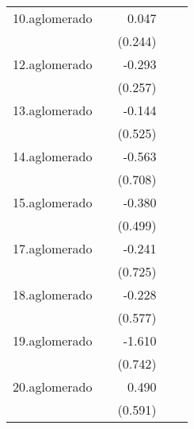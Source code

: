 {\begin{longtable}{l*{4}{D{.}{.}{-1}}}
\addlinespace
10.aglomerado&                     &       0.047         &                     &                     \\
            &                     &     (0.244)         &                     &                     \\
\addlinespace
12.aglomerado&                     &      -0.293         &                     &                     \\
            &                     &     (0.257)         &                     &                     \\
\addlinespace
13.aglomerado&                     &      -0.144         &                     &                     \\
            &                     &     (0.525)         &                     &                     \\
\addlinespace
14.aglomerado&                     &      -0.563         &                     &                     \\
            &                     &     (0.708)         &                     &                     \\
\addlinespace
15.aglomerado&                     &      -0.380         &                     &                     \\
            &                     &     (0.499)         &                     &                     \\
\addlinespace
17.aglomerado&                     &      -0.241         &                     &                     \\
            &                     &     (0.725)         &                     &                     \\
\addlinespace
18.aglomerado&                     &      -0.228         &                     &                     \\
            &                     &     (0.577)         &                     &                     \\
\addlinespace
19.aglomerado&                     &      -1.610\sym{*}  &                     &                     \\
            &                     &     (0.742)         &                     &                     \\
\addlinespace
20.aglomerado&                     &       0.490         &                     &                     \\
            &                     &     (0.591)         &                     &                     \\

\end{longtable}}
